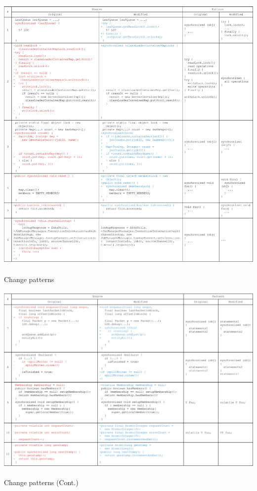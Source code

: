 \begin{table}
	\centering
	\includegraphics[width=1\textwidth]{patterns}
	\caption{Change patterns}
	\label{table:patterns}

\end{table}
\begin{table}
	\centering
	\includegraphics[width=1\textwidth]{patterns2}
	\caption{Change patterns (Cont.)}
	\label{table:patterns2}
\end{table}
